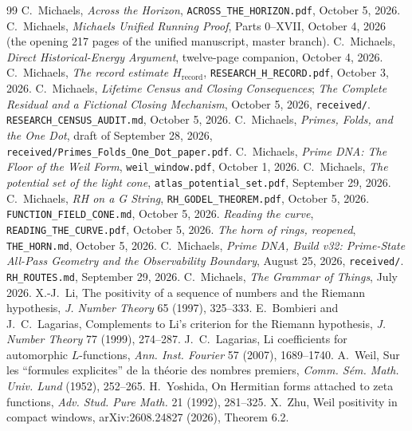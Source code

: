 \documentclass[11pt]{article}
\theoremstyle{definition}
\theoremstyle{remark}
\newcommand{\Hrec}{H_{\mathrm{record}}}
\begin{document}
\begin{thebibliography}{99}\small
{} C.~Michaels, \emph{Across the Horizon}, \texttt{ACROSS\_THE\_HORIZON.pdf}, October 5, 2026.
 C.~Michaels, \emph{Michaels Unified Running Proof}, Parts 0--XVII, October 4, 2026 (the opening 217 pages of the unified manuscript, master branch).
 C.~Michaels, \emph{Direct Historical-Energy Argument}, twelve-page companion, October 4, 2026.
 C.~Michaels, \emph{The record estimate $\Hrec$}, \texttt{RESEARCH\_H\_RECORD.pdf}, October 3, 2026.
 C.~Michaels, \emph{Lifetime Census and Closing Consequences}; \emph{The Complete Residual and a Fictional Closing Mechanism}, October 5, 2026, \texttt{received/}.
 \texttt{RESEARCH\_CENSUS\_AUDIT.md}, October 5, 2026.
 C.~Michaels, \emph{Primes, Folds, and the One Dot}, draft of September 28, 2026, \texttt{received/Primes\_Folds\_One\_Dot\_paper.pdf}.
 C.~Michaels, \emph{Prime DNA: The Floor of the Weil Form}, \texttt{weil\_window.pdf}, October 1, 2026.
 C.~Michaels, \emph{The potential set of the light cone}, \texttt{atlas\_potential\_set.pdf}, September 29, 2026.
 C.~Michaels, \emph{RH on a G String}, \texttt{RH\_GODEL\_THEOREM.pdf}, October 5, 2026.
 \texttt{FUNCTION\_FIELD\_CONE.md}, October 5, 2026.
 \emph{Reading the curve}, \texttt{READING\_THE\_CURVE.pdf}, October 5, 2026.
 \emph{The horn of rings, reopened}, \texttt{THE\_HORN.md}, October 5, 2026.
 C.~Michaels, \emph{Prime DNA, Build v32: Prime-State All-Pass Geometry and the Observability Boundary}, August 25, 2026, \texttt{received/}.
 \texttt{RH\_ROUTES.md}, September 29, 2026.
 C.~Michaels, \emph{The Grammar of Things}, July 2026.
 X.-J.~Li, The positivity of a sequence of numbers and the Riemann hypothesis, \emph{J. Number Theory} 65 (1997), 325--333.
 E.~Bombieri and J.~C.~Lagarias, Complements to Li's criterion for the Riemann hypothesis, \emph{J. Number Theory} 77 (1999), 274--287.
 J.~C.~Lagarias, Li coefficients for automorphic $L$-functions, \emph{Ann. Inst. Fourier} 57 (2007), 1689--1740.
 A.~Weil, Sur les ``formules explicites'' de la th\'eorie des nombres premiers, \emph{Comm. S\'em. Math. Univ. Lund} (1952), 252--265.
 H.~Yoshida, On Hermitian forms attached to zeta functions, \emph{Adv. Stud. Pure Math.} 21 (1992), 281--325.
 X.~Zhu, Weil positivity in compact windows, arXiv:2608.24827 (2026), Theorem 6.2.

\end{thebibliography}
\end{document}
